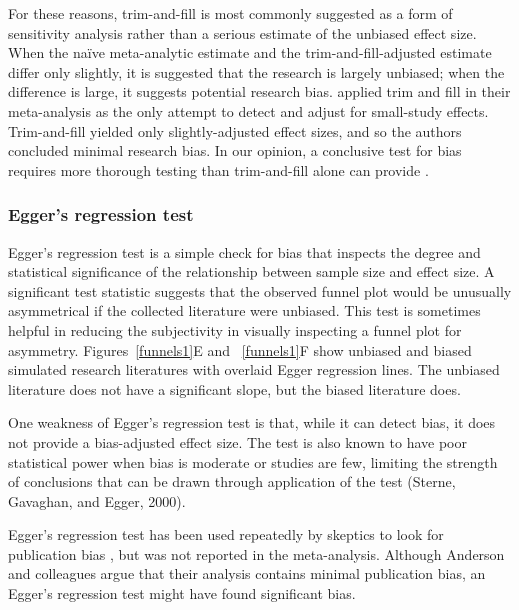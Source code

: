 \documentclass[man]{apa6}
\begin{document}
For these reasons, trim-and-fill is most commonly suggested as a form of sensitivity analysis rather than a serious estimate of the unbiased effect size. When the na{\"i}ve meta-analytic estimate and the trim-and-fill-adjusted estimate differ only slightly, it is suggested that the research is largely unbiased; when the difference is large, it suggests potential research bias.
\citet{Anderson:etal:2010} applied trim and fill in their meta-analysis as the only attempt to detect and adjust for small-study effects. Trim-and-fill yielded only slightly-adjusted effect sizes, and so the authors concluded minimal research bias.  %
In our opinion, a conclusive test for bias requires more thorough testing than trim-and-fill alone can provide \citep[c.f.,][]{Bushman:Huesmann:2014}.

\subsubsection{Egger's regression test}
Egger's regression test \citep{Egger:1997} is a simple check for bias that inspects the degree and statistical significance of the relationship between sample size and effect size. A significant test statistic suggests that the observed funnel plot would be unusually asymmetrical if the collected literature were unbiased. This test is sometimes helpful in reducing the subjectivity in visually inspecting a funnel plot for asymmetry. Figures~\ref{funnels1}E and ~\ref{funnels1}F show unbiased and biased simulated research literatures with overlaid Egger regression lines. The unbiased literature does not have a significant slope, but the biased literature does. 

One weakness of Egger's regression test is that, while it can detect bias, it does not provide a bias-adjusted effect size. The test is also known to have poor statistical power when bias is moderate or studies are few, limiting the strength of conclusions that can be drawn through application of the test (Sterne, Gavaghan, and Egger, 2000).

Egger's regression test has been used repeatedly by skeptics to look for publication bias \citep[e.g.,][]{Ferguson:2007,Ferguson:Kilburn:2009}, but was not reported in the \citet{Anderson:etal:2010} meta-analysis. Although Anderson and colleagues argue that their analysis contains minimal publication bias, an Egger's regression test might have found significant bias.
\end{document}
